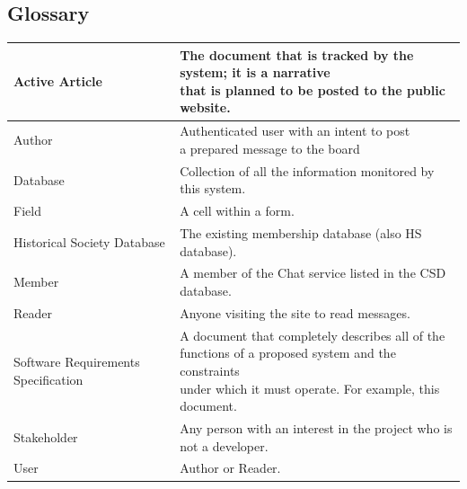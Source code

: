 \documentclass[12pt]{article}
\begin{document}
	\subsection{Glossary}
	\begin{table}[H]
		\begin{tabularx}{1.055\textwidth}{|l|l|}
			\firsthline
			Active Article& \makecell{The document that is tracked by the system; it is a narrative \\that is planned to be posted to the public website.} \\
			\hline
			Author & \makecell{Authenticated user with an intent to post \\a prepared message to the board} \\ \hline
			Database&
			Collection of all the information monitored by this system.\\ \hline
			Field&
			A cell within a form.\\ \hline
			Historical Society Database&
			The existing membership database (also HS database).\\ \hline
			Member&
			A member of the Chat service listed in the CSD database.\\ \hline
			Reader&
			Anyone visiting the site to read messages. \\ \hline
			Software Requirements Specification &
			\makecell{A document that completely describes all of the \\functions of a proposed system and the constraints \\under which it must operate. For example, this document.}\\ \hline
			Stakeholder&
			\makecell{Any person with an interest in the project who is \\not a developer.} \\ \hline
			User &
			Author or Reader.\\
			\hline
		\end{tabularx}
	\end{table}
\end{document}
